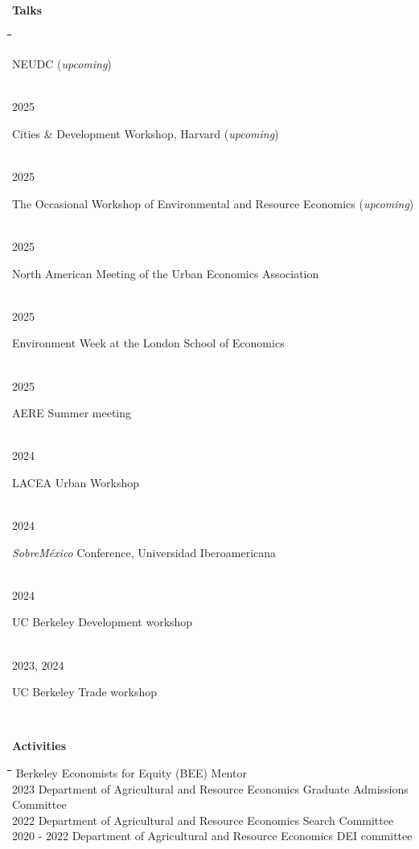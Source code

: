 \documentclass[10pt, oneside]{article}
\makeatletter
\newlength\tdima
\newcommand\tabfill[1]{%
      \setlength\tdima{\linewidth}%
      \addtolength\tdima{\@totalleftmargin}%
      \addtolength\tdima{-\dimen\@curtab}%
      \parbox[t]{\tdima}{#1\ifhmode\strut\fi}}
\newcommand\mytabs{\hspace*{1cm}\=\hspace{1cm}\=\hspace{1cm}\=\hspace{1cm}\=\hspace{1cm}\=\hspace{1cm}\=\hspace{1cm}\=\hspace{1cm}\=\hspace{1cm}\=\hspace{1cm}}
\newenvironment{mysec}[1][\mytabs]
  {\begin{tabbing}#1\kill\ignorespaces}
  {\end{tabbing}}
\makeatother
\begin{document}
\begin{minipage}[t]{0.1\linewidth}
\textbf{Talks}
\end{minipage}\hspace{0.05\linewidth}
\begin{minipage}[t]{0.8\linewidth}
\begin{mysec} 
    2025 \>\> \tabfill{NEUDC (\textit{upcoming})} \\
    2025 \>\> \tabfill{Cities \& Development Workshop, Harvard (\textit{upcoming})} \\
    2025 \>\> \tabfill{The Occasional Workshop of Environmental and Resource Economics (\textit{upcoming})} \\
    2025 \>\> \tabfill{North American Meeting of the Urban Economics Association} \\
    2025 \>\> \tabfill{Environment Week at the London School of Economics} \\
    2025 \>\> \tabfill{AERE Summer meeting} \\
	2024 \>\> \tabfill{LACEA Urban Workshop} \\
    2024 \>\> \tabfill{\textit{SobreMéxico} Conference,  Universidad Iberoamericana}\\ 
    2024 \>\> \tabfill{UC Berkeley Development workshop} \\
    2023, 2024 \>\> \tabfill{UC Berkeley Trade workshop} \\
\end{mysec} 
\end{minipage}\vspace{5mm}


\begin{minipage}[t]{0.1\linewidth}
\textbf{Activities}
\end{minipage}\hspace{0.05\linewidth}
\begin{minipage}[t]{0.8\linewidth}
\begin{mysec}
    2024 \>\> Berkeley Economists for Equity (BEE) Mentor\\ 
    2023 \>\> Department of Agricultural and Resource Economics Graduate Admissions Committee \\
    2022 \>\> Department of Agricultural and Resource Economics Search Committee \\
    2020 - 2022 \>\> Department of Agricultural and Resource Economics DEI committee \\


\end{mysec}
\end{minipage}\vspace{5mm}
\end{document}
